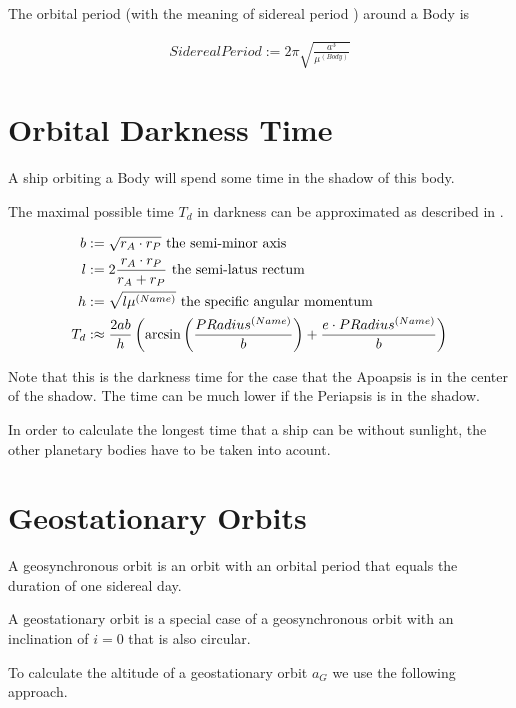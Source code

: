 \documentclass[11pt]{report}
\begin{document}
The  orbital period (with the meaning of
 sidereal period \cite{SIDPER}) around a Body
is

\begin{align}
SiderealPeriod := 2\pi\sqrt{\frac{a^3}{\mu^{(Body)}}}
\end{align}

\section{Orbital Darkness Time}

A ship orbiting a Body will spend some time in the shadow of this
body. 

The maximal possible time $T_d$ in darkness can be approximated as
described in \cite{DarknessTime}.

\begin{align}
  b & := \sqrt{r_A \cdot r_P} \textrm{ the semi-minor axis}\index{Semi-minor axis}\\
  l & := 2\frac{r_A\cdot r_P}{r_A + r_P} \textrm{ the semi-latus rectum} \index{Semi-latus rectum}\\
  h & := \sqrt{l\mu^{(Name)}} \textrm{ the specific angular momentum}\index{Specific angular momentum}\\
  T_d &:\approx \frac{2ab}{h}\left(\arcsin\left(\frac{PRadius^{(Name)}}{b}\right)+\frac{e\cdot PRadius^{(Name)}}{b}\right)
\end{align}

Note that this is the darkness time for the case that the Apoapsis is
in the center of the shadow. The time can be much lower if the
Periapsis is in the shadow.

In order to calculate the longest time that a ship can be without
sunlight, the other planetary bodies have to be taken into acount.

\section{Geostationary Orbits}

A geosynchronous orbit 
\cite{GeosynchronousOrbit} is an orbit with an orbital period that
equals the duration of one sidereal day.

A geostationary orbit  \cite{GeostationaryOrbit} is a special case of
a geosynchronous orbit with an inclination of $i=0$ that is also
circular.

To calculate the altitude of a geostationary orbit $a_G$ we use the
following approach.
\end{document}
